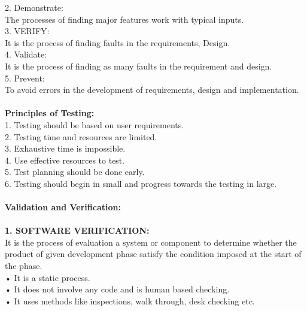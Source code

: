 \documentclass[11pt,a4paper]{report}
\begin{document}
2. Demonstrate:\\
The processes of finding major features work with typical inputs.\\

3. VERIFY:\\
It is the process of finding faults in the requirements, Design.\\

4. Validate:\\
It is the process of finding as many faults in the requirement and design.\\

5. Prevent:\\
To avoid errors in the development of requirements, design and implementation.\\

\textbf{\\Principles of Testing:\\}
1.	Testing should be based on user requirements.\\

2.	Testing time and resources are limited.\\

3. Exhaustive time is impossible.\\

4. Use effective resources to test.\\

5. Test planning should be done early.\\

6. Testing should begin in small and progress towards the testing in large.\\

\textbf{\\Validation and Verification:\\}
\textbf{\\1. SOFTWARE VERIFICATION:\\}
It is the process of evaluation a system or component to determine whether the product of given development phase satisfy the condition imposed at the start of the phase.\\

•	It is a static process.\\

•	It does not involve any code and is human based checking.\\

•	It uses methods like inspections, walk through, desk checking etc.\\
\end{document}
